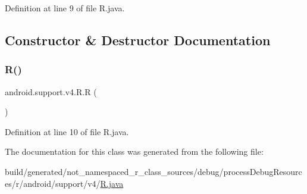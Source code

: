 Definition at line 9 of file R.\+java.



\subsection{Constructor \& Destructor Documentation}
\mbox{\label{classandroid_1_1support_1_1v4_1_1_r_a254130e1af6c1572edc11c48990a7e01}} 
\subsubsection{\texorpdfstring{R()}{R()}}
{\footnotesize\ttfamily android.\+support.\+v4.\+R.\+R (\begin{DoxyParamCaption}{ }\end{DoxyParamCaption})\hspace{0.3cm}{\ttfamily [private]}}



Definition at line 10 of file R.\+java.


\begin{DoxyCode}{0}

\end{DoxyCode}


The documentation for this class was generated from the following file\+:\begin{DoxyCompactItemize}
\item 
build/generated/not\+\_\+namespaced\+\_\+r\+\_\+class\+\_\+sources/debug/process\+Debug\+Resources/r/android/support/v4/\mbox{\hyperlink{android_2support_2v4_2_r_8java}{R.\+java}}\end{DoxyCompactItemize}
